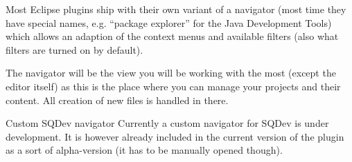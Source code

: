 \documentclass[twoside=false]{scrbook}
\newcommand{\SQDev}{SQDev\xspace}
\newcommand{\eclipse}{Eclipse\xspace}
\begin{document}
\begin{itemize}
		Most \eclipse plugins ship with their own variant of a navigator (most time they have special names, e.g. “package explorer” for the Java Development Tools) which allows an adaption of the context menus and available filters (also what filters are turned on by default).
		
		The navigator will be the view you will be working with the most (except the editor itself) as this is the place where you can manage your projects and their content. All creation of new files is handled in there.
		
		\begin{info}{Custom \SQDev navigator}
			Currently a custom navigator for \SQDev is under development. It is however already included in the current version of the plugin as a sort of alpha-version (it has to be manually opened though).
		\end{info}
	
	
	\end{itemize}
	
	
\end{document}
